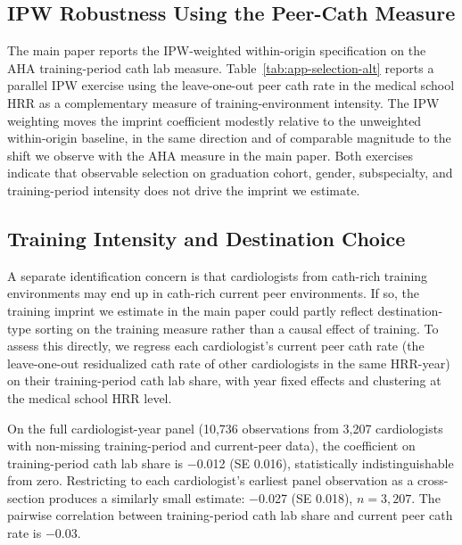 \documentclass[12pt]{article}
\begin{document}
\subsection{IPW Robustness Using the Peer-Cath Measure}

The main paper reports the IPW-weighted within-origin specification on the AHA training-period cath lab measure. Table~\ref{tab:app-selection-alt} reports a parallel IPW exercise using the leave-one-out peer cath rate in the medical school HRR as a complementary measure of training-environment intensity. The IPW weighting moves the imprint coefficient modestly relative to the unweighted within-origin baseline, in the same direction and of comparable magnitude to the shift we observe with the AHA measure in the main paper. Both exercises indicate that observable selection on graduation cohort, gender, subspecialty, and training-period intensity does not drive the imprint we estimate.

\begin{table}[htbp]
\centering
\begin{minipage}[h]{\textwidth}
  \caption{Selection robustness via inverse probability weighting (peer-cath measure)}
  \label{tab:app-selection-alt}
  \centering
  
\end{minipage}
\end{table}

\subsection{Training Intensity and Destination Choice}\label{sec:app-train-dest}

A separate identification concern is that cardiologists from cath-rich training environments may end up in cath-rich current peer environments. If so, the training imprint we estimate in the main paper could partly reflect destination-type sorting on the training measure rather than a causal effect of training. To assess this directly, we regress each cardiologist's current peer cath rate (the leave-one-out residualized cath rate of other cardiologists in the same HRR-year) on their training-period cath lab share, with year fixed effects and clustering at the medical school HRR level.

On the full cardiologist-year panel (10{,}736 observations from 3{,}207 cardiologists with non-missing training-period and current-peer data), the coefficient on training-period cath lab share is $-$0.012 (SE 0.016), statistically indistinguishable from zero. Restricting to each cardiologist's earliest panel observation as a cross-section produces a similarly small estimate: $-$0.027 (SE 0.018), $n = 3{,}207$. The pairwise correlation between training-period cath lab share and current peer cath rate is $-$0.03.
\end{document}
